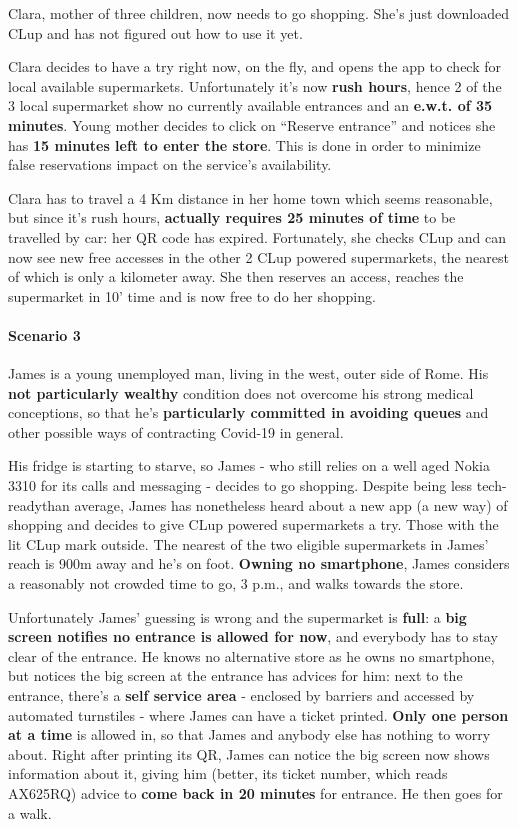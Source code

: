 Clara, mother of three children, now needs to go shopping. She's just downloaded CLup and has not figured out how to use it yet.

Clara decides to have a try right now, on the fly, and opens the app to check for local available supermarkets. 
\newline Unfortunately it's now \textbf{rush hours}, hence 2 of the 3 local supermarket show no currently available entrances and an \textbf{e.w.t. of 35 minutes}. Young mother decides to click on ``Reserve entrance'' and notices she has \textbf{15 minutes left to enter the store}. This is done in order to minimize false reservations impact on the service's availability.

Clara has to travel a 4 Km distance in her home town which seems reasonable, but since it's rush hours, \textbf{actually requires 25 minutes of time} to be travelled by car: her QR code has expired.\newline
Fortunately, she checks CLup and can now see new free accesses in the other 2 CLup powered supermarkets, the nearest of which is only a kilometer away. She then reserves an access, reaches the supermarket in 10' time and is now free to do her shopping.

\paragraph{Scenario 3}
James is a young unemployed man, living in the west, outer side of Rome. His \textbf{not particularly wealthy} condition does not overcome his strong medical conceptions, so that he's \textbf{particularly committed in avoiding queues} and other possible ways of contracting Covid-19 in general.

His fridge is starting to starve, so James - who still relies on a well aged Nokia 3310 for its calls and messaging - decides to go shopping. Despite being \guillemotleft less tech-ready\guillemotright \space than average, James has nonetheless heard about a new app (a new way) of shopping and decides to give CLup powered supermarkets a try. Those with the lit CLup mark outside.
\newline The nearest of the two eligible supermarkets in James' reach is 900m away and he's on foot. \textbf{Owning no smartphone}, James considers a reasonably not crowded time to go, 3 p.m., and walks towards the store. 

Unfortunately James' guessing is wrong and the supermarket is \textbf{full}: a \textbf{big screen notifies no entrance is allowed for now}, and everybody has to stay clear of the entrance. He knows no alternative store as he owns no smartphone, but notices the big screen at the entrance has advices for him: next to the entrance, there's a \textbf{self service area} - enclosed by barriers and accessed by automated turnstiles - where James can have a ticket printed. \textbf{Only one person at a time} is allowed in, so that James and anybody else has nothing to worry about.
\newline Right after printing its QR, James can notice the big screen now shows information about it, giving him (better, its ticket number, which reads AX625RQ) advice to \textbf{come back in 20 minutes} for entrance. He then goes for a walk.

